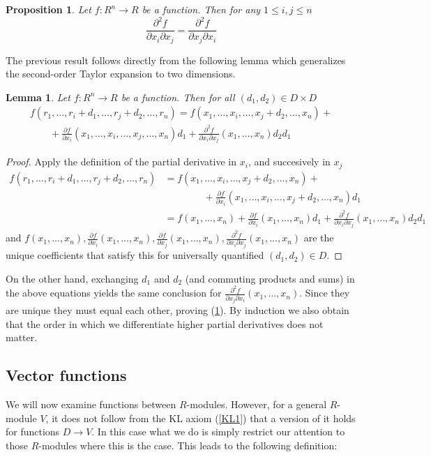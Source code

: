 \documentclass[11pt]{article}
\newtheorem{proposition}{Proposition}[section]
\newtheorem{lemma}{Lemma}[section]
\theoremstyle{definition}
\newcommand{\ddx}[2]{\frac{\partial #1}{\partial #2}} %
\newcommand{\ddxII}[3]{\frac{\partial^{2} #1}{\partial #2 \partial #3}} %
\numberwithin{equation}{section}
\begin{document}
\begin{proposition}
  Let \( f:R^n\to R \) be a function. Then for any \( 1\leq i,j\leq n \)
  \begin{equation*}
    \ddxII{f}{x_i}{x_j}= \ddxII{f}{x_j}{x_i}
  \end{equation*}
  \label{prop:schwarz}
\end{proposition}
The previous result follows directly from the following lemma which generalizes the second-order Taylor expansion to two dimensions.
\begin{lemma}
  Let \( f:R^n \to R \) be a function. Then for all \( (d_1,d_2)\in D\times D \)
  \begin{align*}
    f(r_1,\dots,r_i+d_1,\dots,r_j+d_2,\dots,r_n) = f(x_1,\dots,x_i,\dots,x_j+d_2,\dots,x_n) + \\
    \qquad + \ddx{f}{x_i}(x_1,\dots,x_i,\dots,x_j,\dots,x_n)d_1 + \ddxII{f}{x_i}{x_j}(x_1,\dots,x_n)d_2d_1 
  \end{align*}
\end{lemma}

\begin{proof}
  Apply the definition of the partial derivative in \( x_i \), and succesively in \( x_j \)
  \begin{align*}
    f(r_1,\dots,r_i+d_1,\dots,r_j+d_2,\dots,r_n) & = f(x_1,\dots,x_i,\dots,x_j+d_2,\dots,x_n) + \\
                                                 & \qquad\qquad + \ddx{f}{x_i}(x_1,\dots,x_i,\dots,x_j+d_2,\dots,x_n)d_1 \\
                                                 & = f(x_1,\dots,x_n) + \ddx{f}{x_i}(x_1,\dots,x_n)d_1 + \ddxII{f}{x_i}{x_j}(x_1,\dots,x_n)d_2d_1
  \end{align*}
  and \( f(x_1,\dots,x_n), \ddx{f}{x_i}(x_1,\dots,x_n), \ddx{f}{x_j}(x_1,\dots,x_n), \ddxII{f}{x_i}{x_j}(x_1,\dots,x_n)  \) are the unique coefficients that satisfy this for universally quantified \( (d_1,d_2)\in D \).
\end{proof}

On the other hand, exchanging \( d_1 \) and \( d_2 \) (and commuting products and sums) in the above equations yields the same conclusion for \( \ddxII{f}{x_j}{x_i}(x_1,\dots,x_n) \). Since they are unique they must equal each other, proving (\ref{prop:schwarz}). By induction we also obtain that the order in which we differentiate higher partial derivatives does not matter.

\subsection{Vector functions}
We will now examine functions between \( R \)-modules. However, for a general \( R \)-module \( V \), it does not follow from the KL axiom (\ref{KL1}) that a version of it holds for functions \( D\to V \). In this case what we do is simply restrict our attention to those \( R \)-modules where this is the case. This leads to the following definition:
\end{document}
